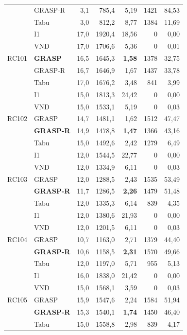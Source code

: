 {\begin{longtable}{llrrrrr}
  & GRASP-R & 3,1 & 785,4 & 5,19 & 1421 & 84,53 \\
  & Tabu & 3,0 & 812,2 & 8,77 & 1384 & 11,69 \\
\midrule
\multirow{5}{*}{RC101}
  & I1 & 17,0 & 1920,4 & 18,56 & 0 & 0,00 \\
  & VND & 17,0 & 1706,6 & 5,36 & 0 & 0,01 \\
  & \textbf{GRASP} & 16,5 & 1645,3 & \textbf{1,58} & 1378 & 32,75 \\
  & GRASP-R & 16,7 & 1646,9 & 1,67 & 1437 & 33,78 \\
  & Tabu & 17,0 & 1676,2 & 3,48 & 841 & 3,99 \\
\midrule
\multirow{5}{*}{RC102}
  & I1 & 15,0 & 1813,3 & 24,42 & 0 & 0,00 \\
  & VND & 15,0 & 1533,1 & 5,19 & 0 & 0,03 \\
  & GRASP & 14,7 & 1481,1 & 1,62 & 1512 & 47,47 \\
  & \textbf{GRASP-R} & 14,9 & 1478,8 & \textbf{1,47} & 1366 & 43,16 \\
  & Tabu & 15,0 & 1492,6 & 2,42 & 1279 & 6,49 \\
\midrule
\multirow{5}{*}{RC103}
  & I1 & 12,0 & 1544,5 & 22,77 & 0 & 0,00 \\
  & VND & 12,0 & 1334,9 & 6,11 & 0 & 0,03 \\
  & GRASP & 12,0 & 1288,5 & 2,43 & 1535 & 53,49 \\
  & \textbf{GRASP-R} & 11,7 & 1286,5 & \textbf{2,26} & 1479 & 51,48 \\
  & Tabu & 12,0 & 1335,3 & 6,14 & 839 & 4,35 \\
\midrule
\multirow{5}{*}{RC104}
  & I1 & 12,0 & 1380,6 & 21,93 & 0 & 0,00 \\
  & VND & 12,0 & 1201,5 & 6,11 & 0 & 0,03 \\
  & GRASP & 10,7 & 1163,0 & 2,71 & 1379 & 44,40 \\
  & \textbf{GRASP-R} & 10,6 & 1158,5 & \textbf{2,31} & 1570 & 49,66 \\
  & Tabu & 12,0 & 1197,0 & 5,71 & 955 & 5,13 \\
\midrule
\multirow{5}{*}{RC105}
  & I1 & 16,0 & 1838,0 & 21,42 & 0 & 0,00 \\
  & VND & 15,0 & 1568,1 & 3,59 & 0 & 0,03 \\
  & GRASP & 15,9 & 1547,6 & 2,24 & 1584 & 51,94 \\
  & \textbf{GRASP-R} & 15,3 & 1540,1 & \textbf{1,74} & 1450 & 46,40 \\
  & Tabu & 15,0 & 1558,8 & 2,98 & 839 & 4,17 \\

\end{longtable}}
